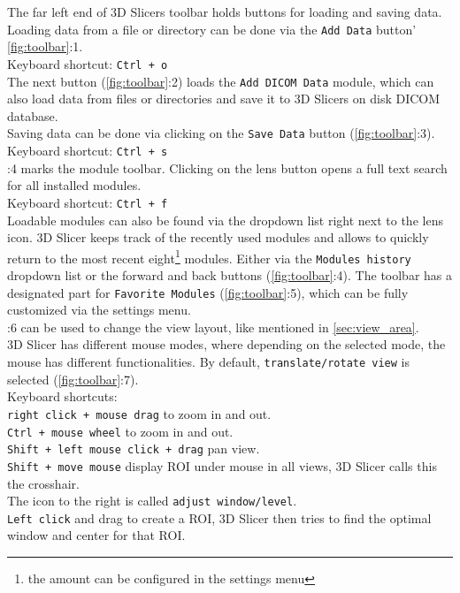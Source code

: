 \noindent
The far left end of 3D Slicers toolbar holds buttons for loading and saving data.
Loading data from a file or directory can be done via the \texttt{Add Data} button' \cref{fig:toolbar}:1.\\
Keyboard shortcut: \texttt{Ctrl + o}\\
The next button (\cref{fig:toolbar}:2) loads the \texttt{Add DICOM Data} module, which can also load data from files or directories and save it to 3D Slicers on disk DICOM database.\\
Saving data can be done via clicking on the \texttt{Save Data} button (\cref{fig:toolbar}:3).\\Keyboard shortcut: \texttt{Ctrl + s}\\
:4 marks the module toolbar. Clicking on the lens button opens a full text search for all installed modules.\\
Keyboard shortcut: \texttt{Ctrl + f}\\
Loadable modules can also be found via the dropdown list right next to the lens icon.
3D Slicer keeps track of the recently used modules and allows to quickly return to the most recent eight\footnote{the amount can be configured in the settings menu} modules.
Either via the \texttt{Modules history} dropdown list or the forward and back buttons (\cref{fig:toolbar}:4).
The toolbar has a designated part for \texttt{Favorite Modules} (\cref{fig:toolbar}:5), which can be fully customized via the settings menu.\\
:6 can be used to change the view layout, like mentioned in \cref{sec:view_area}.\\
3D Slicer has different mouse modes, where depending on the selected mode, the mouse has different functionalities. By default, \texttt{translate/rotate view} is selected (\cref{fig:toolbar}:7).\\
Keyboard shortcuts:\\
\texttt{right click + mouse drag} to zoom in and out.\\
\texttt{Ctrl + mouse wheel} to zoom in and out.\\
\texttt{Shift + left mouse click + drag} pan view.\\
\texttt{Shift + move mouse} display ROI under mouse in all views, 3D Slicer calls this the crosshair.\\
\noindent
The icon to the right is called \texttt{adjust window/level}.\\
\texttt{Left click} and drag to create a ROI, 3D Slicer then tries to find the optimal window and center for that ROI.\\
